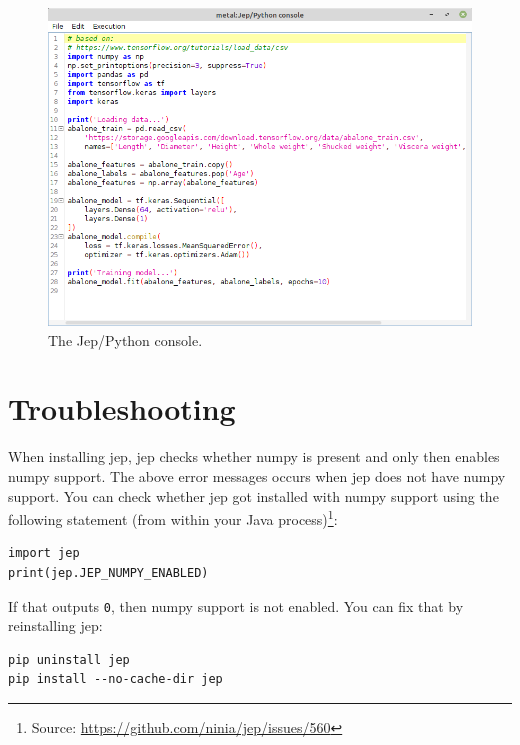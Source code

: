 \documentclass[a4paper]{book}
\begin{document}
\begin{figure}[ht]
	\centering
	\includegraphics[width=\textwidth]{images/jep-console.png}
	\caption{The Jep/Python console.}
	\label{jep-console}
\end{figure}

\clearpage
\section{Troubleshooting}
When installing jep, jep checks whether numpy is present and only then enables numpy support. The
above error messages occurs when jep does not have numpy support. You can check whether jep got
installed with numpy support using the following statement (from within your Java process)\footnote{Source: \url{https://github.com/ninia/jep/issues/560}{}}:
\begin{verbatim}
import jep
print(jep.JEP_NUMPY_ENABLED)
\end{verbatim}
If that outputs \texttt{0}, then numpy support is not enabled. You can fix that by reinstalling jep:
\begin{verbatim}
pip uninstall jep
pip install --no-cache-dir jep
\end{verbatim}



\end{document}
